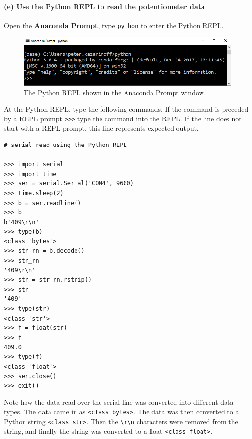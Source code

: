\documentclass[11pt]{article}
\begin{document}
    \hypertarget{e-use-the-python-repl-to-read-the-potentiometer-data}{%
\paragraph{(e) Use the Python REPL to read the potentiometer
data}\label{e-use-the-python-repl-to-read-the-potentiometer-data}}

Open the \textbf{Anaconda Prompt}, type \texttt{python} to enter the
Python REPL.

\begin{figure}
\centering
\includegraphics{images/anaconda_prompt_python_REPL.png}
\caption{The Python REPL shown in the Anaconda Prompt window}
\end{figure}

At the Python REPL, type the following commands. If the command is
preceded by a REPL prompt
\texttt{\textgreater{}\textgreater{}\textgreater{}} type the command
into the REPL. If the line does not start with a REPL prompt, this line
represents expected output.

\begin{verbatim}
# serial read using the Python REPL

>>> import serial
>>> import time
>>> ser = serial.Serial('COM4', 9600)
>>> time.sleep(2)
>>> b = ser.readline()
>>> b
b'409\r\n'
>>> type(b)
<class 'bytes'>
>>> str_rn = b.decode()
>>> str_rn
'409\r\n'
>>> str = str_rn.rstrip()
>>> str
'409'
>>> type(str)
<class 'str'>
>>> f = float(str)
>>> f
409.0
>>> type(f)
<class 'float'>
>>> ser.close()
>>> exit()
\end{verbatim}

Note how the data read over the serial line was converted into different
data types. The data came in as
\texttt{\textless{}class\ \textquotesingle{}bytes\textquotesingle{}\textgreater{}}.
The data was then converted to a Python string
\texttt{\textless{}class\ \textquotesingle{}str\textquotesingle{}\textgreater{}}.
Then the \texttt{\textbackslash{}r\textbackslash{}n} characters were
removed from the string, and finally the string was converted to a float
\texttt{\textless{}class\ \textquotesingle{}float\textquotesingle{}\textgreater{}}.
\end{document}
